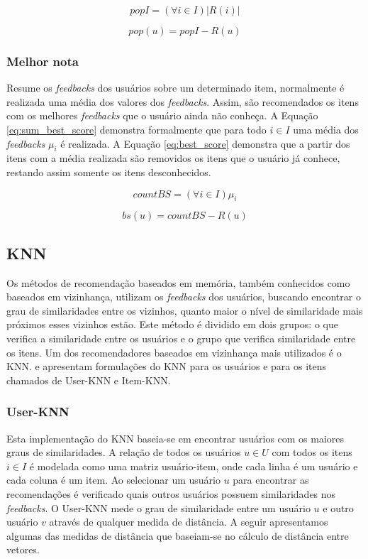 \begin{equation}
    \label{eq:popularity_count}
    popI = (\forall i \in I) |R(i)|
\end{equation}

\begin{equation}
    \label{eq:popularity}
    pop(u) = popI - R(u)
\end{equation}

\subsubsection{Melhor nota} Resume os \textit{feedbacks} dos usuários sobre um determinado item, normalmente é realizada uma média dos valores dos \textit{feedbacks}. Assim, são recomendados os itens com os melhores \textit{feedbacks} que o usuário ainda não conheça. A Equação \ref{eq:sum_best_score} demonstra formalmente que para todo $i \in I$ uma média dos \textit{feedbacks} $\mu_i$ é realizada. A Equação \ref{eq:best_score} demonstra que a partir dos itens com a média realizada são removidos os itens que o usuário já conhece, restando assim somente os itens desconhecidos.

\begin{equation}
    \label{eq:sum_best_score}
    countBS = (\forall i \in I) \mu_i
\end{equation}

\begin{equation}
    \label{eq:best_score}
    bs(u) = countBS - R(u)
\end{equation}

\subsection{KNN}
\label{sec:knn_algos}
Os métodos de recomendação baseados em memória, também conhecidos como baseados em vizinhança, utilizam os \textit{feedbacks} dos usuários, buscando encontrar o grau de similaridades entre os vizinhos, quanto maior o nível de similaridade mais próximos esses vizinhos estão. Este método é dividido em dois grupos: o que verifica a similaridade entre os usuários e o grupo que verifica similaridade entre os itens. Um dos recomendadores baseados em vizinhança mais utilizados é o \ac{KNN}.  e  apresentam formulações do \ac{KNN} para os usuários e para os itens chamados de User-KNN e Item-KNN.

\subsubsection{User-KNN} Esta implementação do \ac{KNN} baseia-se em encontrar usuários com os maiores graus de similaridades. A relação de todos os usuários $u \in U$ com todos os itens $i \in I$ é modelada como uma matriz usuário-item, onde cada linha é um usuário e cada coluna é um item. Ao selecionar um usuário $u$ para encontrar as recomendações é verificado quais outros usuários possuem similaridades nos \textit{feedbacks}. O User-KNN mede o grau de similaridade entre um usuário $u$ e outro usuário $v$ através de qualquer medida de distância. A seguir apresentamos algumas das medidas de distância que baseiam-se no cálculo de distância entre vetores.

